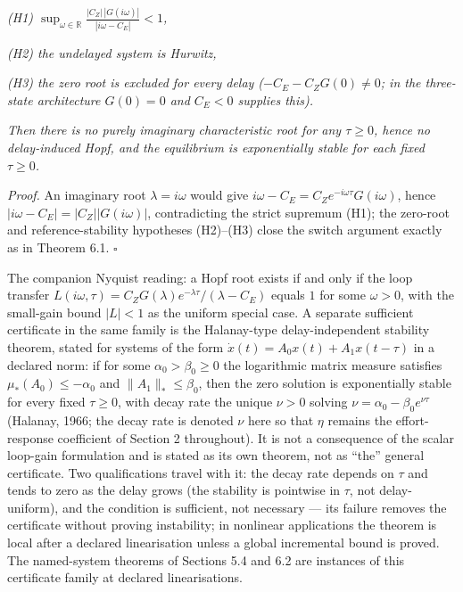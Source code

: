 \documentclass[11pt]{article}
\begin{document}
\emph{(H1)
\(\sup_{\omega \in \mathbb{R}} \frac{|C_Z|\,|G(i\omega)|}{|i\omega - C_E|} < 1\),}

\emph{(H2) the undelayed system is Hurwitz,}

\emph{(H3) the zero root is excluded for every delay
(\(-C_E - C_Z G(0) \neq 0\); in the three-state architecture
\(G(0) = 0\) and \(C_E < 0\) supplies this).}

\emph{Then there is no purely imaginary characteristic root for any
\(\tau \ge 0\), hence no delay-induced Hopf, and the equilibrium is
exponentially stable for each fixed \(\tau \ge 0\).}

\emph{Proof.} An imaginary root \(\lambda = i\omega\) would give
\(i\omega - C_E = C_Z e^{-i\omega\tau}G(i\omega)\), hence
\(|i\omega - C_E| = |C_Z||G(i\omega)|\), contradicting the strict
supremum (H1); the zero-root and reference-stability hypotheses
(H2)--(H3) close the switch argument exactly as in Theorem 6.1. \ensuremath{\square}

The companion Nyquist reading: a Hopf root exists if and only if the
loop transfer
\(L(i\omega, \tau) = C_Z G(\lambda)e^{-\lambda\tau}/(\lambda - C_E)\)
equals \(1\) for some \(\omega > 0\), with the small-gain bound
\(|L| < 1\) as the uniform special case. A separate sufficient
certificate in the same family is the Halanay-type delay-independent
stability theorem, stated for systems of the form
\(\dot x(t) = A_0 x(t) + A_1 x(t - \tau)\) in a declared norm: if for
some \(\alpha_0 > \beta_0 \ge 0\) the logarithmic matrix measure
satisfies \(\mu_*(A_0) \le -\alpha_0\) and \(\|A_1\|_* \le \beta_0\),
then the zero solution is exponentially stable for every fixed
\(\tau \ge 0\), with decay rate the unique \(\nu > 0\) solving
\(\nu = \alpha_0 - \beta_0 e^{\nu\tau}\) (Halanay, 1966; the decay rate
is denoted \(\nu\) here so that \(\eta\) remains the effort-response
coefficient of Section 2 throughout). It is not a consequence of the
scalar loop-gain formulation and is stated as its own theorem, not as
``the'' general certificate. Two qualifications travel with it: the
decay rate depends on \(\tau\) and tends to zero as the delay grows (the
stability is pointwise in \(\tau\), not delay-uniform), and the
condition is sufficient, not necessary --- its failure removes the
certificate without proving instability; in nonlinear applications the
theorem is local after a declared linearisation unless a global
incremental bound is proved. The named-system theorems of Sections 5.4
and 6.2 are instances of this certificate family at declared
linearisations.
\end{document}
